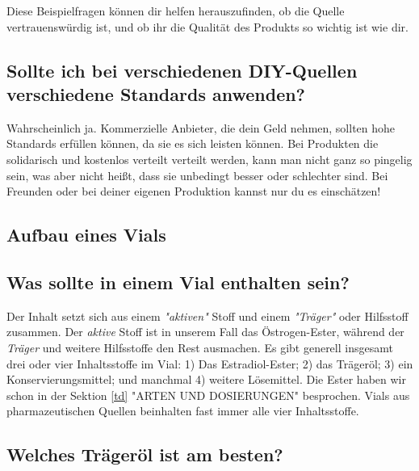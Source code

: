 \documentclass{article}
\begin{document}
Diese Beispielfragen können dir helfen herauszufinden, ob die Quelle vertrauenswürdig ist, und ob ihr die Qualität des Produkts so wichtig ist wie dir.

\subsection{Sollte ich bei verschiedenen DIY-Quellen verschiedene Standards anwenden?}

Wahrscheinlich ja. Kommerzielle Anbieter, die dein Geld nehmen, sollten hohe Standards erfüllen können, da sie es sich leisten können. Bei Produkten die solidarisch und kostenlos verteilt verteilt werden, kann man nicht ganz so pingelig sein, was aber nicht heißt, dass sie unbedingt besser oder schlechter sind. Bei Freunden oder bei deiner eigenen Produktion kannst nur du es einschätzen!

\subsection*{Aufbau eines Vials}

\subsection{Was sollte in einem Vial enthalten sein?}

Der Inhalt setzt sich aus einem \textit{"aktiven"} Stoff und einem \textit{"Träger"} oder Hilfsstoff zusammen. Der \textit{aktive} Stoff ist in unserem Fall das Östrogen-Ester, während der \textit{Träger} und weitere Hilfsstoffe den Rest ausmachen. Es gibt generell insgesamt drei oder vier Inhaltsstoffe im Vial: 1) Das Estradiol-Ester; 2) das Trägeröl; 3) ein Konservierungsmittel; und manchmal 4) weitere Lösemittel. Die Ester haben wir schon in der Sektion \ref{td} "ARTEN UND DOSIERUNGEN" besprochen. Vials aus pharmazeutischen Quellen beinhalten fast immer alle vier Inhaltsstoffe.

\subsection{Welches Trägeröl ist am besten?}\label{6-16}
\end{document}

